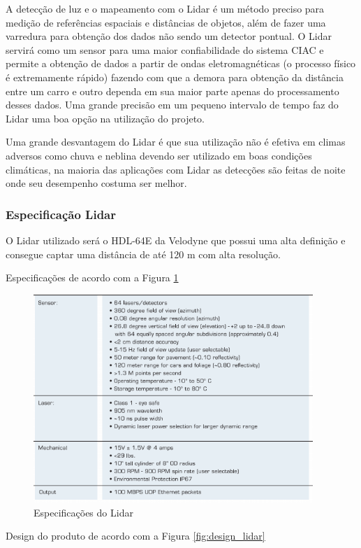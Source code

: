 	A detecção de luz e o mapeamento com o Lidar é um método preciso para medição
  de referências espaciais e distâncias de objetos, além de fazer uma varredura
  para obtenção dos dados não sendo um detector pontual. O Lidar servirá como um
  sensor para uma maior confiabilidade do sistema CIAC e permite a obtenção de dados
  a partir de ondas eletromagnéticas (o processo físico é extremamente rápido)
  fazendo com que a demora para obtenção da distância entre um carro e outro
  dependa em sua maior parte apenas do processamento desses dados. Uma grande
  precisão em um pequeno intervalo de tempo faz do Lidar uma boa opção
  na utilização do projeto.

	Uma grande desvantagem do Lidar é que sua utilização não é efetiva em
  climas adversos como chuva e neblina devendo ser utilizado em boas condições
  climáticas, na maioria das aplicações com Lidar as detecções são feitas
  de noite onde seu desempenho costuma ser melhor.

\subsubsection{Especificação Lidar}

O Lidar utilizado será o HDL-64E da Velodyne que possui uma alta definição e consegue captar uma distância de até 120 m com alta resolução.

Especificações de acordo com a Figura \ref{fig:especificacoes_lidar}

\begin{figure}[h]
  \centering
  \includegraphics[width=400px, scale=1]{figuras/especificacoes_lidar}
  \caption{Especificações do Lidar}
\label{fig:especificacoes_lidar}
\end{figure}

Design do produto de acordo com a Figura \ref{fig:design_lidar}

